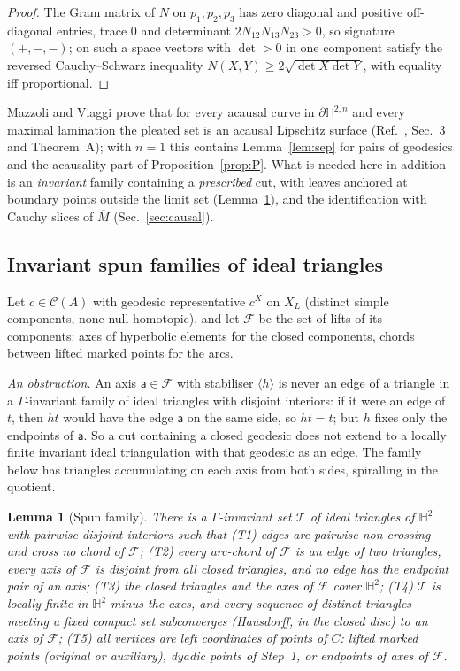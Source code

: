 \documentclass[aps,prd,onecolumn,superscriptaddress,nofootinbib,amsmath,amssymb,11pt]{revtex4-2}
\newtheorem{lemma}[theorem]{Lemma}
\theoremstyle{definition}
\newcommand{\Hyp}{\mathbb{H}^2}
\newcommand{\Cut}{\mathcal{C}}
\newcommand{\Mbar}{\overline{M}}
\begin{document}
\begin{proof}
The Gram matrix of $N$ on $p_1,p_2,p_3$ has zero diagonal and positive off-diagonal entries, trace $0$ and determinant
$2N_{12}N_{13}N_{23}>0$, so signature $(+,-,-)$; on such a space vectors with $\det>0$ in one component satisfy the reversed
Cauchy--Schwarz inequality $N(X,Y)\ge2\sqrt{\det X\det Y}$, with equality iff proportional.
\end{proof}

Mazzoli and Viaggi prove that for every acausal curve in $\partial\mathbb H^{2,n}$ and every maximal lamination the pleated
set is an acausal Lipschitz surface (Ref.~\cite{MazzoliViaggi2022}, Sec.~3 and Theorem~A); with $n=1$ this contains
Lemma~\ref{lem:sep} for pairs of geodesics and the acausality part of Proposition~\ref{prop:P}. What is needed here in
addition is an \emph{invariant} family containing a \emph{prescribed} cut, with leaves anchored at boundary points outside the
limit set (Lemma~\ref{lem:T}), and the identification with Cauchy slices of $\Mbar$ (Sec.~\ref{sec:causal}).

\subsection{Invariant spun families of ideal triangles}

Let $c\in\Cut(A)$ with geodesic representative $c^X$ on $X_L$ (distinct simple components, none null-homotopic), and let
$\mathcal F$ be the set of lifts of its components: axes of hyperbolic elements for the closed components, chords between
lifted marked points for the arcs.

\emph{An obstruction.} An axis $\mathsf a\in\mathcal F$ with stabiliser $\langle h\rangle$ is never an edge of a triangle in a
$\Gamma$-invariant family of ideal triangles with disjoint interiors: if it were an edge of $t$, then $ht$ would have the edge
$\mathsf a$ on the same side, so $ht=t$; but $h$ fixes only the endpoints of $\mathsf a$. So a cut containing a closed geodesic
does not extend to a locally finite invariant ideal triangulation with that geodesic as an edge. The family below has
triangles accumulating on each axis from both sides, spiralling in the quotient.

\begin{lemma}[Spun family]\label{lem:T}
There is a $\Gamma$-invariant set $\mathcal T$ of ideal triangles of $\Hyp$ with pairwise disjoint interiors such that
(T1) edges are pairwise non-crossing and cross no chord of $\mathcal F$; (T2) every arc-chord of $\mathcal F$ is an edge of two
triangles, every axis of $\mathcal F$ is disjoint from all closed triangles, and no edge has the endpoint pair of an axis;
(T3) the closed triangles and the axes of $\mathcal F$ cover $\Hyp$; (T4) $\mathcal T$ is locally finite in $\Hyp$ minus the axes,
and every sequence of distinct triangles meeting a fixed compact set subconverges (Hausdorff, in the closed disc) to an
axis of $\mathcal F$; (T5) all vertices are left coordinates of points of $C$: lifted marked points (original or auxiliary),
dyadic points of Step~1, or endpoints of axes of $\mathcal F$.
\end{lemma}
\end{document}

